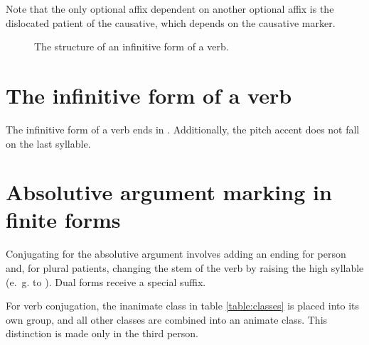 \documentclass{book}
\begin{document}
Note that the only optional affix dependent on another optional affix is the dislocated patient of the causative, which depends on the causative marker.

\begin{figure}[h]
    \caption{The structure of an infinitive form of a verb.}
    \centering
\end{figure}

\section{The infinitive form of a verb}

The infinitive form of a verb ends in . Additionally, the pitch accent does not fall on the last syllable.

\section{Absolutive argument marking in finite forms}

Conjugating for the absolutive argument involves adding an ending for person and, for plural patients, changing the stem of the verb by raising the high syllable (e.~g.  to ). Dual forms receive a special suffix.

For verb conjugation, the inanimate class in table \ref{table:classes} is placed into its own group, and all other classes are combined into an animate class. This distinction is made only in the third person.
\end{document}
